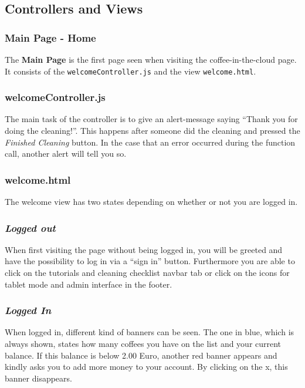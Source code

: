 \subsection{Controllers and Views}\label{controllers-and-views}

\subsubsection{Main Page - Home}\label{main-page---home}

The \textbf{Main Page} is the first page seen when visiting the
coffee-in-the-cloud page. It consists of the
\texttt{welcomeController.js} and the view \texttt{welcome.html}.

\subsubsection*{welcomeController.js}

The main task of the controller is to give an alert-message saying
``Thank you for doing the cleaning!''. This happens after someone did
the cleaning and pressed the \emph{Finished Cleaning} button. In the
case that an error occurred during the function call, another alert will
tell you so.

\subsubsection*{welcome.html}

The welcome view has two states depending on whether or not you are
logged in.

\subsubsection*{\emph{Logged out}}

When first visiting the page without being logged in, you will be
greeted and have the possibility to log in via a ``sign in'' button.
Furthermore you are able to click on the tutorials and cleaning checklist
navbar tab or click on the icons for tablet mode and admin interface in
the footer.

\subsubsection*{\emph{Logged In}}

When logged in, different kind of banners can be seen. The one in blue,
which is always shown, states how many coffees you have on the list and
your current balance. If this balance is below 2.00 Euro, another red
banner appears and kindly asks you to add more money to your account. By
clicking on the x, this banner disappears.

